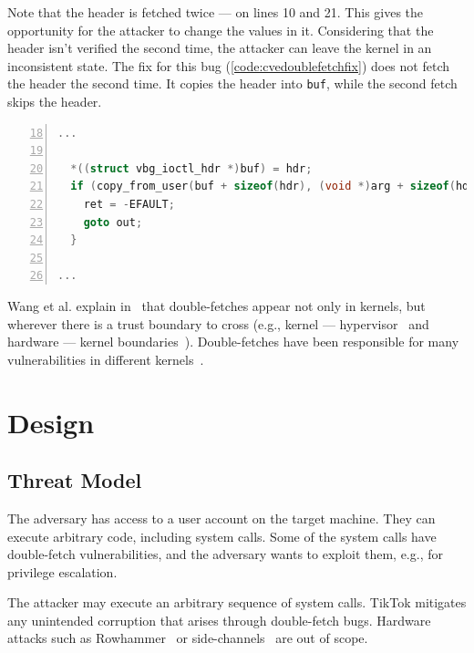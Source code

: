\documentclass[conference]{IEEEtran}
\newcommand{\sysname}{TikTok}
\begin{document}
Note that the header is fetched twice --- on lines 10 and 21. This gives the
opportunity for the attacker to change the values in it. Considering
that the header isn't verified the second time, the attacker can
leave the kernel in an inconsistent state. The fix for this bug
(\autoref{code:cvedoublefetchfix}) does not fetch the header the second time. It
copies the header into \texttt{buf}, while the second fetch skips the header.

\begin{lstlisting}[language=C, caption=CVE-2018-12633 Double Fetch Fix~\cite{cve201812633fix},
  label=code:cvedoublefetchfix,  breaklines=true
  postbreak=\mbox{\textcolor{red}{$\hookrightarrow$}\space},
  numbers=left,basicstyle=\scriptsize, firstnumber=18, xleftmargin=5.0ex]
...

  *((struct vbg_ioctl_hdr *)buf) = hdr;
  if (copy_from_user(buf + sizeof(hdr), (void *)arg + sizeof(hdr), hdr.size_in - sizeof(hdr))) {
    ret = -EFAULT;
    goto out;
  }

...

\end{lstlisting}

Wang et al. explain in~\cite{wang2018survey} that double-fetches appear not only
in kernels, but wherever there is a trust boundary to cross (e.g., kernel ---
hypervisor~\cite{wilhelm2016xenpwn} and hardware --- kernel
boundaries~\cite{lu2018untrusted}). Double-fetches have been responsible for many
vulnerabilities in different kernels~\cite{jurczyk2013bochspwn, wang2018survey}.


\section{Design}
\subsection{Threat Model}
\label{sec:threatmodel}

The adversary has access to a user account on the target machine. They can
execute arbitrary code, including system calls. Some of the system calls
have double-fetch vulnerabilities, and the adversary wants to exploit them,
e.g., for privilege escalation.

The attacker may execute an arbitrary sequence of system calls. \sysname{}
mitigates any unintended corruption that arises through double-fetch bugs.
Hardware attacks such as Rowhammer~\cite{mutlu2019rowhammer} or
side-channels~\cite{kocher2019spectre} are out of scope.
\end{document}
